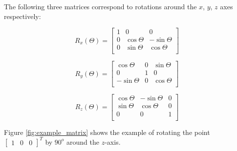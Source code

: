 The following three matrices correspond to rotations around the $x$,
$y$, $z$ axes respectively:

\begin{samepage}
\begin{equation}
R_x(\Theta) = 
\begin{bmatrix}
1 & 0 & 0 \\
0 & \cos{\Theta} & -\sin{\Theta} \\
0 & \sin{\Theta} & \cos{\Theta} \\
\end{bmatrix}
\end{equation}

\begin{equation}
R_y(\Theta) = 
\begin{bmatrix}
 \cos{\Theta}& 0  & \sin{\Theta} \\
0 & 1 & 0 \\
-\sin{\Theta} & 0  & \cos{\Theta} \\
\end{bmatrix}
\end{equation}

\begin{equation}
R_z(\Theta) = 
\begin{bmatrix}
\cos{\Theta} & -\sin{\Theta} & 0 \\
\sin{\Theta} & \cos{\Theta} & 0 \\
0 & 0 & 1 \\
\end{bmatrix}
\end{equation}
\end{samepage}

Figure \ref{fig:example_matrix} shows the example of rotating the
point $\begin{bmatrix}1& 0& 0\end{bmatrix}^T$ by $90^o$ around the
  $z$-axis.

